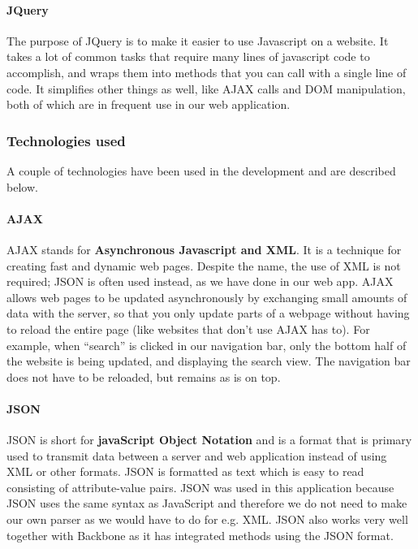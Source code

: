 \paragraph{JQuery}
The purpose of JQuery\cite{web_6} is to make it easier to use Javascript on a website. It takes a lot of common tasks that require many lines of javascript code to accomplish, and wraps them into methods that you can call with a single line of code. It simplifies other things as well, like AJAX calls and DOM manipulation, both of which are in frequent use in our web application.


\subsubsection{Technologies used}
A couple of technologies have been used in the development and are described below.

\paragraph{AJAX}
AJAX\cite{web_3} stands for \textbf{Asynchronous Javascript and XML}. It is a technique for creating fast and dynamic web pages. Despite the name, the use of XML is not required; JSON is often used instead, as we have done in our web app. AJAX allows web pages to be updated asynchronously by exchanging small amounts of data with the server, so that you only update parts of a webpage without having to reload the entire page (like websites that don’t use AJAX has to). For example, when “search” is clicked in our navigation bar, only the bottom half of the website is being updated, and displaying the search view. The navigation bar does not have to be reloaded, but remains as is on top.

\paragraph{JSON}
JSON\cite{web_4} is short for \textbf{javaScript Object Notation} and is a format that is primary used to transmit data between a server and web application instead of using XML or other formats.
JSON is formatted as text which is easy to read consisting of attribute-value pairs.
JSON was used in this application because JSON uses the same syntax as JavaScript and therefore we do not need to make our own parser as we would have to do for e.g. XML. JSON also works very well together with Backbone as it has integrated methods using the JSON format.

